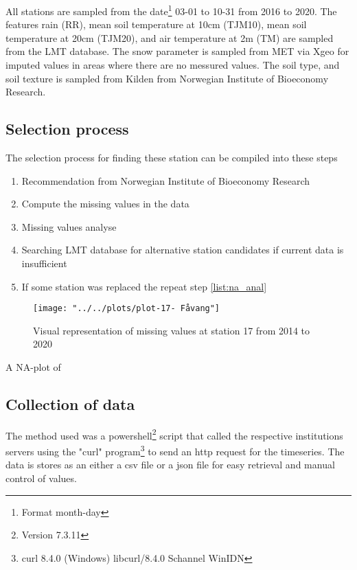 All stations are sampled from the date\footnote{Format month-day} 03-01 to 10-31 from 2016 to 2020. The features rain (RR), mean soil temperature at 10cm (TJM10), mean soil temperature at 20cm (TJM20), and air temperature at 2m (TM) are sampled from the LMT database. The snow parameter is sampled from MET via Xgeo for imputed values in areas where there are no messured values. The soil type, and soil texture is sampled from Kilden from Norwegian Institute of Bioeconomy Research.

\subsection{Selection process}
The selection process for finding these station can be compiled into these steps

\begin{enumerate}
	\item Recommendation from Norwegian Institute of Bioeconomy Research
	\item \label{list:na_anal}Compute the missing values in the data
	\item Missing values analyse 
	\item Searching LMT database for alternative station candidates if current data is insufficient
	\item If some station was replaced the repeat step \ref{list:na_anal}
\end{enumerate}

\begin{figure}
	\label{fig:plot-17--favang}
	\texttt{[image: "../../plots/plot-17- Fåvang"]}
	\caption{Visual representation of missing values at station 17 from 2014 to 2020}
\end{figure}

A NA-plot of 

\subsection{Collection of data}

The method used was a powershell\footnote{Version 7.3.11} script that called the respective institutions servers using the "curl" program\footnote{curl 8.4.0 (Windows) libcurl/8.4.0 Schannel WinIDN} to send an http request for the timeseries. The data is stores as an either a csv file or a json file for easy retrieval and manual control of values. 